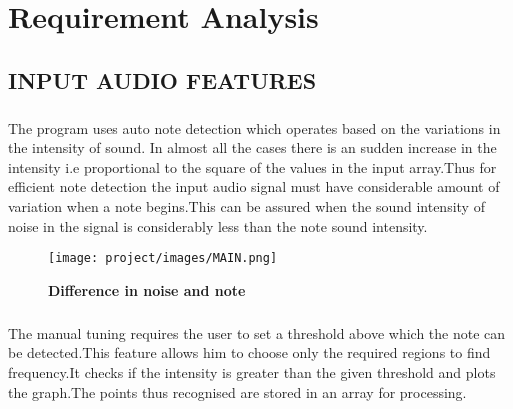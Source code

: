 \chapter{Requirement Analysis}
\section{INPUT AUDIO FEATURES}
\paragraph{} The program uses auto note detection which operates based on the variations in the intensity of sound. In almost all the cases there is an sudden increase in the intensity i.e proportional to the square of the values in the input array.Thus for efficient note detection the input audio signal must have considerable amount of variation when a note begins.This can be assured when the sound intensity of noise in the signal is considerably less than the note sound intensity.
\begin{figure}[H]
 \centering
   \texttt{[image: project/images/MAIN.png]}
  \caption{\textbf{Difference in noise and note }}
  
\end{figure}
\paragraph{} The manual tuning requires the user to set a threshold above which the note can be detected.This feature allows him to choose only the required regions to find frequency.It checks if the intensity is greater than the given threshold and plots the graph.The points thus recognised are stored in an array for processing.